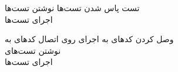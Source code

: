 \begin{wbsbox}{}
\begin{wbssub}
{تست }
{پاس شدن تست‌ها}
\task 
نوشتن تست‌ها \\
\task
اجرای تست‌ها
\end{wbssub}

\begin{wbssub}
{وصل کردن کد‌های  به }
{اجرای  روی }
\task
اتصال کد‌های  به  \\
\task
نوشتن تست‌های  \\
\task
اجرای تست‌ها
\end{wbssub}
\end{wbsbox}
